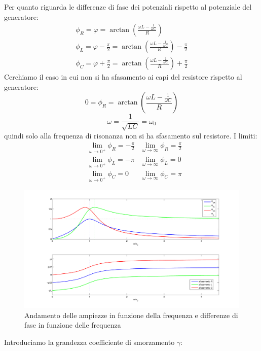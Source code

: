 Per quanto riguarda le differenze di fase dei potenziali rispetto al potenziale del generatore:
\begin{subequations}
\begin{gather}
\phi_R=\varphi=\arctan\left(\frac{\omega L-\frac{1}{\omega C}}{R}\right)\\
\phi_L=\varphi-\frac{\pi}{2}=\arctan\left(\frac{\omega L-\frac{1}{\omega C}}{R}\right)-\frac{\pi}{2}\\
\phi_C=\varphi+\frac{\pi}{2}=\arctan\left(\frac{\omega L-\frac{1}{\omega C}}{R}\right)+\frac{\pi}{2}
\end{gather}
\end{subequations}
Cerchiamo il caso in cui non si ha sfasamento ai capi del resistore rispetto al generatore:
\[
0=\phi_R=\arctan\left(\frac{\omega L-\frac{1}{\omega C}}{R}\right)
\]
\begin{equation}
\omega=\frac{1}{\sqrt{LC}}=\omega_0
\end{equation}
quindi solo alla frequenza di risonanza non si ha sfasamento sul resistore. I limiti:
\begin{subequations}
\begin{align}
&\lim_{\omega\to 0^+}\phi_R=-\frac{\pi}{2}&\lim_{\omega\to\infty}\phi_R=\frac{\pi}{2}\\
&\lim_{\omega\to 0^+}\phi_L=-\pi&\lim_{\omega\to\infty}\phi_L=0\\
&\lim_{\omega\to 0^+}\phi_C=0&\lim_{\omega\to\infty}\phi_C=\pi
\end{align}
\end{subequations}
\begin{figure}[htbp]
\centering
\includegraphics[scale=0.45]{immagini/fisica2/RLC_01}
\caption{Andamento delle ampiezze in funzione della frequenza e differenze di fase in funzione delle frequenza}
\end{figure}
Introduciamo la grandezza coefficiente di smorzamento $\gamma$:
